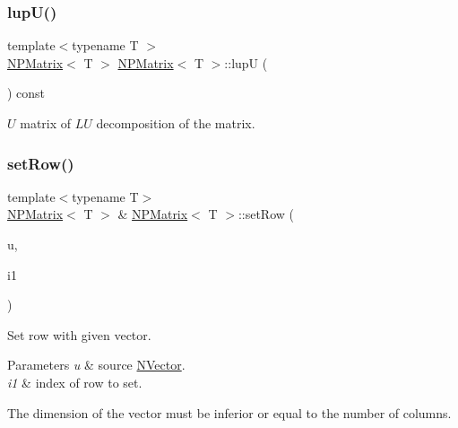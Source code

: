 \subsubsection{\texorpdfstring{lupU()}{lupU()}}
{\footnotesize\ttfamily template$<$typename T $>$ \\
\mbox{\hyperlink{class_n_p_matrix}{N\+P\+Matrix}}$<$ T $>$ \mbox{\hyperlink{class_n_p_matrix}{N\+P\+Matrix}}$<$ T $>$\+::lupU (\begin{DoxyParamCaption}{ }\end{DoxyParamCaption}) const}



$ U $ matrix of $ LU $ decomposition of the matrix. 

\mbox{\label{class_n_p_matrix_aac65ad5cc7a3a73b8eddbd8501957ca6}} 
\subsubsection{\texorpdfstring{setRow()}{setRow()}}
{\footnotesize\ttfamily template$<$typename T$>$ \\
\mbox{\hyperlink{class_n_p_matrix}{N\+P\+Matrix}}$<$ T $>$ \& \mbox{\hyperlink{class_n_p_matrix}{N\+P\+Matrix}}$<$ T $>$\+::set\+Row (\begin{DoxyParamCaption}\item[{const \mbox{\hyperlink{class_n_vector}{N\+Vector}}$<$ T $>$ \&}]{u,  }\item[{\mbox{\hyperlink{typedef_8h_a1b140a2034db3f5dfe18a987745df43a}{ul\+\_\+t}}}]{i1 }\end{DoxyParamCaption})}



Set row with given vector. 


\begin{DoxyParams}{Parameters}
{\em u} & source {\ttfamily \mbox{\hyperlink{class_n_vector}{N\+Vector}}}. \\
\hline
{\em i1} & index of row to set.\\
\hline
\end{DoxyParams}
The dimension of the vector must be inferior or equal to the number of columns. \mbox{\label{class_n_p_matrix_ac950c160738743255b84702fca1e521d}} 
